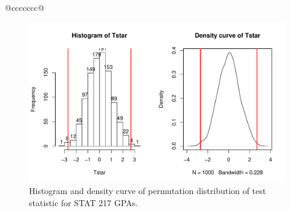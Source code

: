 \documentclass[]{book}
\newenvironment{Shaded}{\begin{snugshade}}{\end{snugshade}}
\newcommand{\KeywordTok}[1]{\textcolor[rgb]{0.13,0.29,0.53}{\textbf{#1}}}
\newcommand{\DataTypeTok}[1]{\textcolor[rgb]{0.13,0.29,0.53}{#1}}
\newcommand{\DecValTok}[1]{\textcolor[rgb]{0.00,0.00,0.81}{#1}}
\newcommand{\StringTok}[1]{\textcolor[rgb]{0.31,0.60,0.02}{#1}}
\newcommand{\OtherTok}[1]{\textcolor[rgb]{0.56,0.35,0.01}{#1}}
\newcommand{\ControlFlowTok}[1]{\textcolor[rgb]{0.13,0.29,0.53}{\textbf{#1}}}
\newcommand{\OperatorTok}[1]{\textcolor[rgb]{0.81,0.36,0.00}{\textbf{#1}}}
\newcommand{\NormalTok}[1]{#1}
\theoremstyle{definition}
\theoremstyle{definition}
\theoremstyle{remark}
\begin{document}
\begin{longtable}[]{@{}ccccccc@{}}
\begin{minipage}[b]{0.10\columnwidth}
\begin{Shaded}
\begin{Highlighting}[]
\begin{Shaded}
\begin{Highlighting}[]
\begin{Shaded}
\end{Shaded}




\begin{figure}
\centering
\includegraphics{02-reintroductionToStatistics_files/figure-latex/Figure2-16-1.pdf}
\caption{\label{fig:Figure2-16}Histogram and density curve of permutation distribution of
test statistic for STAT 217 GPAs.}
\end{figure}


\end{Highlighting}
\end{Shaded}
\end{Highlighting}
\end{Shaded}
\end{minipage}
\end{longtable}
\end{document}
